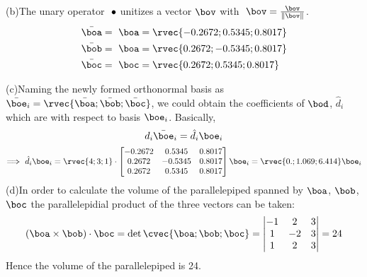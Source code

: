 \documentclass[a4paper,twosided,11pt,DIV15]{scrartcl}
\begin{document}
(b)\quad The unary operator $\unit\ \bullet$
unitizes a vector $\bov$ with $\unit\ \bov = \frac{\bov}{\|\bov\|}$.
\begin{align*}
\bar{\boa} &= \unit\ \boa = \rvec{-0.2672;0.5345;0.8017}\\
\bar{\bob} &= \unit\ \boa = \rvec{0.2672;-0.5345;0.8017}\\ 
\bar{\boc} &= \unit\ \boc = \rvec{0.2672;0.5345;0.8017}
\end{align*}

(c)\quad Naming the newly formed orthonormal basis as
$\bar{\boe}_i=\rvec{\bar{\boa};\bar{\bob};\bar{\boc}}$, we could obtain
the coefficients of $\bod$, $\hat{d}_i$ which are with respect to
basis $\boe_i$. Basically,
$$d_i\bar{\boe}_i = \hat{d}_i\boe_i$$
$$\Longrightarrow\ 
\hat{d}_i\boe_i=\rvec{4;3;1}\cdot
\begin{bmatrix}
-0.2672&0.5345&0.8017\\
0.2672&-0.5345&0.8017\\
0.2672&0.5345&0.8017\\
\end{bmatrix}\boe_i
=\rvec{0.;1.069;6.414}\boe_i
$$
(d)\quad In order to calculate the volume of the parallelepiped
spanned by $\boa$, $\bob$, $\boc$ the parallelepidial product of the
three vectors can be taken:
$$ (\boa \times \bob)\cdot \boc = \det\cvec{\boa;\bob;\boc} = 
\begin{vmatrix} -1&2&3\\1&-2&3\\1&2&3\end{vmatrix} = 24$$
Hence the volume of the parallelepiped is 24.
\end{document}
